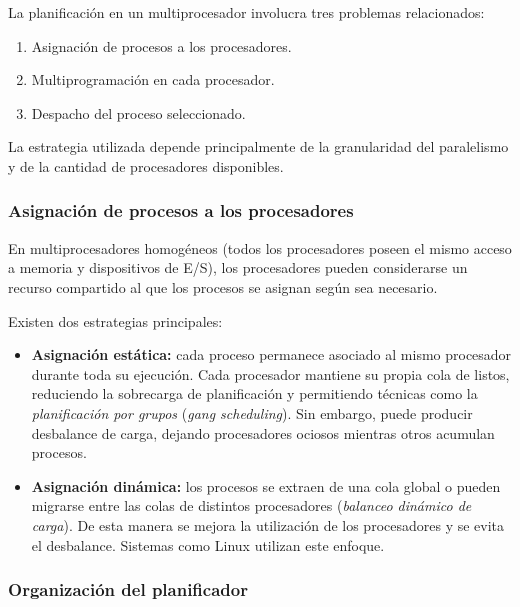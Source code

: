 La planificación en un multiprocesador involucra tres problemas relacionados:
\begin{enumerate}
  \item Asignación de procesos a los procesadores.
  \item Multiprogramación en cada procesador.
  \item Despacho del proceso seleccionado.
\end{enumerate}

La estrategia utilizada depende principalmente de la granularidad del paralelismo y de la cantidad de procesadores disponibles.

\subsubsection{Asignación de procesos a los procesadores}

En multiprocesadores homogéneos (todos los procesadores poseen el mismo acceso a memoria y dispositivos de E/S), los procesadores pueden considerarse un recurso compartido al que los procesos se asignan según sea necesario.

Existen dos estrategias principales:
\begin{itemize}
  \item \textbf{Asignación estática:} cada proceso permanece asociado al mismo procesador durante toda su ejecución. Cada procesador mantiene su propia cola de listos, reduciendo la sobrecarga de planificación y permitiendo técnicas como la \textit{planificación por grupos} (\textit{gang scheduling}). Sin embargo, puede producir desbalance de carga, dejando procesadores ociosos mientras otros acumulan procesos.
  \item \textbf{Asignación dinámica:} los procesos se extraen de una cola global o pueden migrarse entre las colas de distintos procesadores (\textit{balanceo dinámico de carga}). De esta manera se mejora la utilización de los procesadores y se evita el desbalance. Sistemas como Linux utilizan este enfoque.
\end{itemize}

\subsubsection{Organización del planificador}

